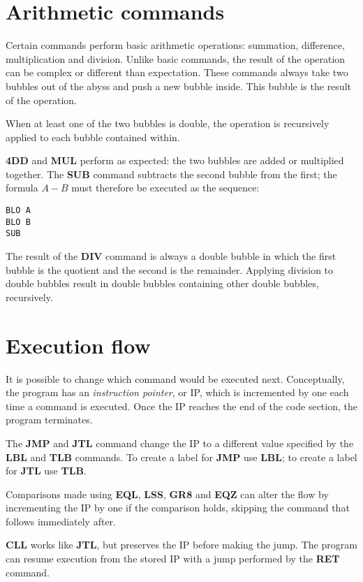 \documentclass[11pt,a4paper,draft]{book}
\begin{document}
\section{Arithmetic commands}
Certain commands perform basic arithmetic operations: summation,
difference, multiplication and division. Unlike basic commands, the
result of the operation can be complex or different than
expectation. These commands always take two bubbles out of the abyss
and push a new bubble inside. This bubble is the result of the
operation.

When at least one of the two bubbles is double, the operation is
recursively applied to each bubble contained within.

\textbf{4DD} and \textbf{MUL} perform as expected: the two bubbles are
added or multiplied together. The \textbf{SUB} command subtracts the
second bubble from the first; the formula \(A - B\) must therefore be
executed as the sequence:
\begin{verbatim}
BLO A
BLO B
SUB
\end{verbatim}

The result of the \textbf{DIV} command is always a double bubble in
which the first bubble is the quotient and the second is the
remainder. Applying division to double bubbles result in double
bubbles containing other double bubbles, recursively.

\section{Execution flow}
It is possible to change which command would be executed
next. Conceptually, the program has an \emph{instruction pointer}, or
IP, which is incremented by one each time a command is executed. Once
the IP reaches the end of the code section, the program terminates.

The \textbf{JMP} and \textbf{JTL} command change the IP to a different
value specified by the \textbf{LBL} and \textbf{TLB} commands. To
create a label for \textbf{JMP} use \textbf{LBL}; to create a label
for \textbf{JTL} use \textbf{TLB}.

Comparisons made using \textbf{EQL}, \textbf{LSS}, \textbf{GR8} and
\textbf{EQZ} can alter the flow by incrementing the IP by one if the
comparison holds, skipping the command that follows immediately after.

\textbf{CLL} works like \textbf{JTL}, but preserves the IP before
making the jump. The program can resume execution from the stored IP
with a jump performed by the \textbf{RET} command.
\end{document}
